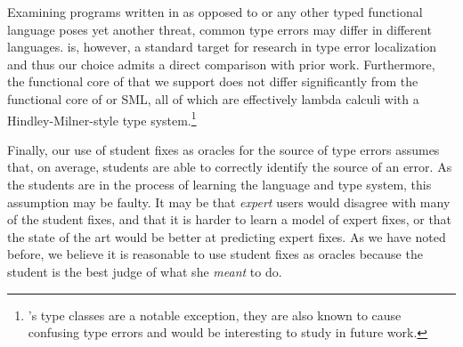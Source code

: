 Examining programs written in \ocaml as opposed to \haskell or any other
typed functional language poses yet another threat, common type errors
may differ in different languages.
%
\ocaml is, however, a standard target for research in type error
localization and thus our choice admits a direct comparison with prior
work.
%
Furthermore, the functional core of \ocaml that we support does not
differ significantly from the functional core of \haskell or SML, all of
which are effectively lambda calculi with a Hindley-Milner-style type
system.\footnote{\haskell's type classes are a notable exception, they
  are also known to cause confusing type errors and would be interesting
  to study in future work.}

Finally, our use of student fixes as oracles for the source of type
errors assumes that, on average, students are able to correctly identify
the source of an error.
%
As the students are in the process of learning the language and type
system, this assumption may be faulty.
%
It may be that \emph{expert} users would disagree with many of the
student fixes, and that it is harder to learn a model of expert fixes,
or that the state of the art would be better at predicting expert fixes.
%
As we have noted before, we believe it is reasonable to use student
fixes as oracles because the student is the best judge of what she
\emph{meant} to do.


